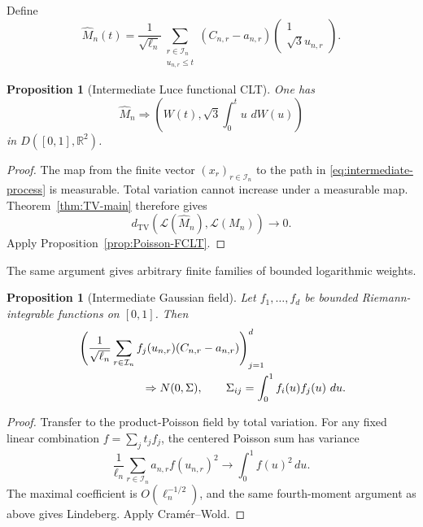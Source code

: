 \documentclass[11pt]{article}
\newtheorem{proposition}[theorem]{Proposition}
\theoremstyle{definition}
\theoremstyle{remark}
\newcommand{\dd}{\,d}
\newcommand{\TV}{\mathrm{TV}}
\newcommand{\cL}{\mathcal L}
\newcommand{\cI}{\mathcal I}
\newcommand{\R}{\mathbb R}
\begin{document}
Define
\begin{equation}\label{eq:intermediate-process}
 \widehat M_n(t)=\frac1{\sqrt{\ell_n}}
 \sum_{\substack{r\in\cI_n\\u_{n,r}\le t}}
 (C_{n,r}-a_{n,r})
 \begin{pmatrix}1\\ \sqrt3u_{n,r}\end{pmatrix}.
\end{equation}

\begin{proposition}[Intermediate Luce functional CLT]
\label{prop:Luce-intermediate-FCLT}
One has
\begin{equation}\label{eq:Luce-intermediate-FCLT}
 \widehat M_n\Rightarrow
 \left(W(t),\sqrt3\int_0^t u\,\dd W(u)\right)
\end{equation}
in $D([0,1],\R^2)$.
\end{proposition}

\begin{proof}
The map from the finite vector $(x_r)_{r\in\cI_n}$ to the path in
\eqref{eq:intermediate-process} is measurable.  Total variation cannot
increase under a measurable map.  Theorem~\ref{thm:TV-main} therefore gives
\[
 d_{\TV}(\cL(\widehat M_n),\cL(M_n))\longrightarrow0.
\]
Apply Proposition~\ref{prop:Poisson-FCLT}.
\end{proof}

The same argument gives arbitrary finite families of bounded logarithmic
weights.

\begin{proposition}[Intermediate Gaussian field]
\label{prop:intermediate-field}
Let $f_1,\ldots,f_d$ be bounded Riemann-integrable functions on $[0,1]$.
Then
\begin{align}
 &\left(
 \frac1{\sqrt{\ell_n}}
 \sum_{r\in\cI_n}f_j(u_{n,r})(C_{n,r}-a_{n,r})
 \right)_{j=1}^d
 \notag\\
 &\hspace{2cm}\Rightarrow
 N(0,\Sigma),
 \qquad
 \Sigma_{ij}=\int_0^1f_i(u)f_j(u)\,\dd u.
 \label{eq:intermediate-field}
\end{align}
\end{proposition}

\begin{proof}
Transfer to the product-Poisson field by total variation.  For any fixed
linear combination $f=\sum_jt_jf_j$, the centered Poisson sum has variance
\[
 \frac1{\ell_n}\sum_{r\in\cI_n}a_{n,r}f(u_{n,r})^2
 \longrightarrow\int_0^1f(u)^2\dd u.
\]
The maximal coefficient is $O(\ell_n^{-1/2})$, and the same fourth-moment
argument as above gives Lindeberg.  Apply Cram\'er--Wold.
\end{proof}
\end{document}
